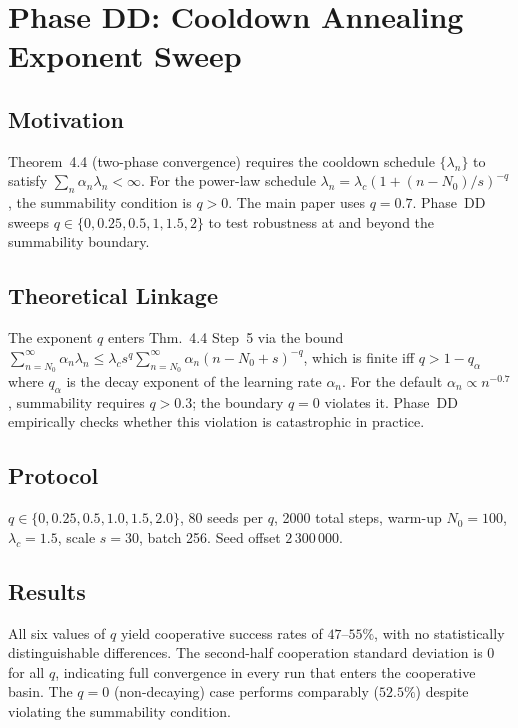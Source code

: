 \documentclass[11pt,a4paper]{article}
\begin{document}
\section{Phase DD: Cooldown Annealing Exponent Sweep}
\label{sec:dd}

\subsection{Motivation}

Theorem~4.4 (two-phase convergence) requires the cooldown schedule
$\{\lambda_n\}$ to satisfy $\sum_n \alpha_n\lambda_n<\infty$. For the
power-law schedule $\lambda_n = \lambda_c(1+(n-N_0)/s)^{-q}$, the summability
condition is $q>0$. The main paper uses $q=0.7$. Phase~DD sweeps
$q\in\{0,0.25,0.5,1,1.5,2\}$ to test robustness at and beyond the summability
boundary.

\subsection{Theoretical Linkage}

The exponent $q$ enters Thm.~4.4 Step~5 via the bound
$\sum_{n=N_0}^{\infty}\alpha_n\lambda_n \leq \lambda_c s^q \sum_{n=N_0}^\infty
\alpha_n (n-N_0+s)^{-q}$, which is finite iff $q>1-q_\alpha$ where $q_\alpha$
is the decay exponent of the learning rate $\alpha_n$. For the default
$\alpha_n\propto n^{-0.7}$, summability requires $q>0.3$; the boundary
$q=0$ violates it. Phase~DD empirically checks whether this violation
is catastrophic in practice.

\subsection{Protocol}

$q\in\{0,0.25,0.5,1.0,1.5,2.0\}$, 80 seeds per $q$, 2000 total steps,
warm-up $N_0=100$, $\lambda_c=1.5$, scale $s=30$, batch 256.
Seed offset $2\,300\,000$.

\subsection{Results}



All six values of $q$ yield cooperative success rates of $47$--$55\%$, with
no statistically distinguishable differences. The second-half cooperation
standard deviation is 0 for all $q$, indicating full convergence in every run
that enters the cooperative basin. The $q=0$ (non-decaying) case performs
comparably ($52.5\%$) despite violating the summability condition.
\end{document}
